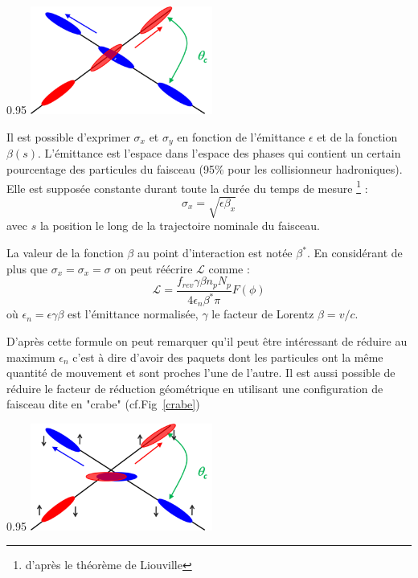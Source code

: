 \begin{minipagewithmarginpars}[ht!]{0.95\textwidth}
\centering
\includegraphics[width=0.45\textwidth]{LHC/collision.png}
\label{collision}	
\end{minipagewithmarginpars}

Il est possible d'exprimer $\sigma_{x}$ et $\sigma_{y}$ en fonction de l'émittance $\epsilon$ et de la fonction $\beta(s)$. L'émittance est l'espace dans l'espace des phases qui contient un certain pourcentage des particules du faisceau (\num{95}\% pour les collisionneur hadroniques). Elle est supposée constante durant toute la durée du temps de mesure \footnote{d'après le théorème de Liouville} :
\begin{equation}
\sigma_{x}=\sqrt{\epsilon\beta_{x}}
\end{equation}
avec $s$ la position le long de la trajectoire nominale du faisceau.

La valeur de la fonction $\beta$ au point d'interaction est notée $\beta^{*}$. En considérant de plus que $\sigma_{x}=\sigma_{x}=\sigma$ on peut réécrire $\mathcal{L}$ comme :
\begin{equation}
\mathcal{L}=\frac{f_{rev}\gamma\beta n_{p}N_{p}}{4\epsilon_{n}\beta^{*}\pi} F(\phi)
\end{equation}
où $\epsilon_{n}=\epsilon\gamma\beta$ est l'émittance normalisée, $\gamma$ le facteur de Lorentz $\beta=v/c$.

D'après cette formule on peut remarquer qu'il peut être intéressant de réduire au maximum $\epsilon_{n}$ c'est à dire d'avoir des paquets dont les particules ont la même quantité de mouvement et sont proches l'une de l'autre. Il est aussi possible de réduire le facteur de réduction géométrique en utilisant une configuration de faisceau dite en "crabe" (cf.Fig~\ref{crabe})

\begin{minipagewithmarginpars}[ht!]{0.95\textwidth}
\centering
\includegraphics[width=0.45\textwidth]{LHC/crab.png}
\label{crabe}	
\end{minipagewithmarginpars}

